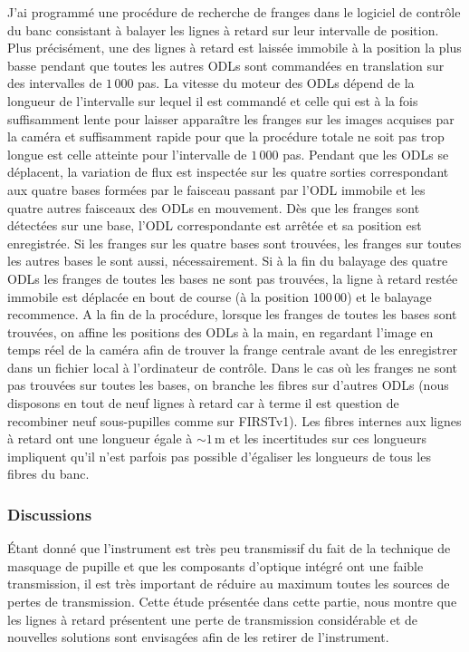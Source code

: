 J'ai programmé une procédure de recherche de franges dans le logiciel de contrôle du banc consistant à balayer les lignes à retard sur leur intervalle de position. Plus précisément, une des lignes à retard est laissée immobile à la position la plus basse pendant que toutes les autres \ac{ODL}s sont commandées en translation sur des intervalles de $1\,000$ pas. La vitesse du moteur des \ac{ODL}s dépend de la longueur de l'intervalle sur lequel il est commandé et celle qui est à la fois suffisamment lente pour laisser apparaître les franges sur les images acquises par la caméra et suffisamment rapide pour que la procédure totale ne soit pas trop longue est celle atteinte pour l'intervalle de $1\,000$ pas. Pendant que les \ac{ODL}s se déplacent, la variation de flux est inspectée sur les quatre sorties correspondant aux quatre bases formées par le faisceau passant par l'\ac{ODL} immobile et les quatre autres faisceaux des \ac{ODL}s en mouvement. Dès que les franges sont détectées sur une base, l'\ac{ODL} correspondante est arrêtée et sa position est enregistrée. Si les franges sur les quatre bases sont trouvées, les franges sur toutes les autres bases le sont aussi, nécessairement. Si à la fin du balayage des quatre \ac{ODL}s les franges de toutes les bases ne sont pas trouvées, la ligne à retard restée immobile est déplacée en bout de course (à la position $100\,00$) et le balayage recommence. A la fin de la procédure, lorsque les franges de toutes les bases sont trouvées, on affine les positions des \ac{ODL}s à la main, en regardant l'image en temps réel de la caméra afin de trouver la frange centrale avant de les enregistrer dans un fichier local à l'ordinateur de contrôle. Dans le cas où les franges ne sont pas trouvées sur toutes les bases, on branche les fibres sur d'autres \ac{ODL}s (nous disposons en tout de neuf lignes à retard car à terme il est question de recombiner neuf sous-pupilles comme sur \ac{FIRSTv1}). Les fibres internes aux lignes à retard ont une longueur égale à $\sim 1 \,$m et les incertitudes sur ces longueurs impliquent qu'il n'est parfois pas possible d'égaliser les longueurs de tous les fibres du banc.


\subsubsection{Discussions}

Étant donné que l'instrument est très peu transmissif du fait de la technique de masquage de pupille et que les composants d'optique intégré ont une faible transmission, il est très important de réduire au maximum toutes les sources de pertes de transmission. Cette étude présentée dans cette partie, nous montre que les lignes à retard présentent une perte de transmission considérable et de nouvelles solutions sont envisagées afin de les retirer de l'instrument.

